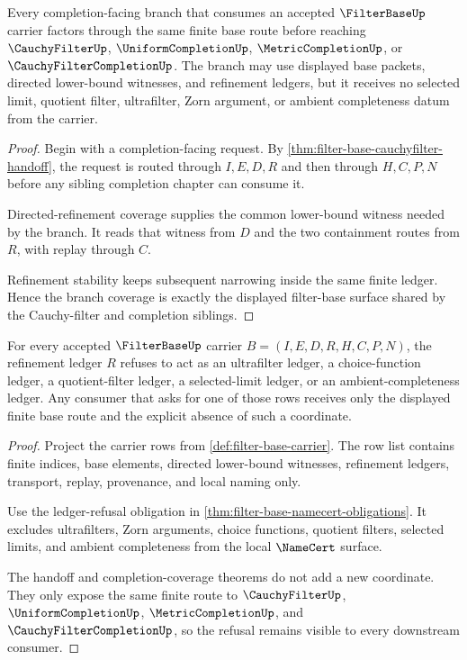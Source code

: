 \begin{theorem}
\label{thm:filter-base-completion-branch-coverage}
Every completion-facing branch that consumes an accepted $\FilterBaseUp$ carrier factors through the same finite base route before reaching $\CauchyFilterUp$, $\UniformCompletionUp$, $\MetricCompletionUp$, or $\CauchyFilterCompletionUp$. The branch may use displayed base packets, directed lower-bound witnesses, and refinement ledgers, but it receives no selected limit, quotient filter, ultrafilter, Zorn argument, or ambient completeness datum from the carrier.
\end{theorem}
\begin{proof}
Begin with a completion-facing request. By \autoref{thm:filter-base-cauchyfilter-handoff}, the request is routed through $I,E,D,R$ and then through $H,C,P,N$ before any sibling completion chapter can consume it.

Directed-refinement coverage supplies the common lower-bound witness needed by the branch. It reads that witness from $D$ and the two containment routes from $R$, with replay through $C$.

Refinement stability keeps subsequent narrowing inside the same finite ledger. Hence the branch coverage is exactly the displayed filter-base surface shared by the Cauchy-filter and completion siblings.
\end{proof}

\begin{theorem}
\label{thm:filter-base-ledger-refusal}
For every accepted $\FilterBaseUp$ carrier $B=(I,E,D,R,H,C,P,N)$, the refinement ledger $R$ refuses to act as an ultrafilter ledger, a choice-function ledger, a quotient-filter ledger, a selected-limit ledger, or an ambient-completeness ledger. Any consumer that asks for one of those rows receives only the displayed finite base route and the explicit absence of such a coordinate.
\end{theorem}
\begin{proof}
Project the carrier rows from \autoref{def:filter-base-carrier}. The row list contains finite indices, base elements, directed lower-bound witnesses, refinement ledgers, transport, replay, provenance, and local naming only.

Use the ledger-refusal obligation in \autoref{thm:filter-base-namecert-obligations}. It excludes ultrafilters, Zorn arguments, choice functions, quotient filters, selected limits, and ambient completeness from the local $\NameCert$ surface.

The handoff and completion-coverage theorems do not add a new coordinate. They only expose the same finite route to $\CauchyFilterUp$, $\UniformCompletionUp$, $\MetricCompletionUp$, and $\CauchyFilterCompletionUp$, so the refusal remains visible to every downstream consumer.
\end{proof}


